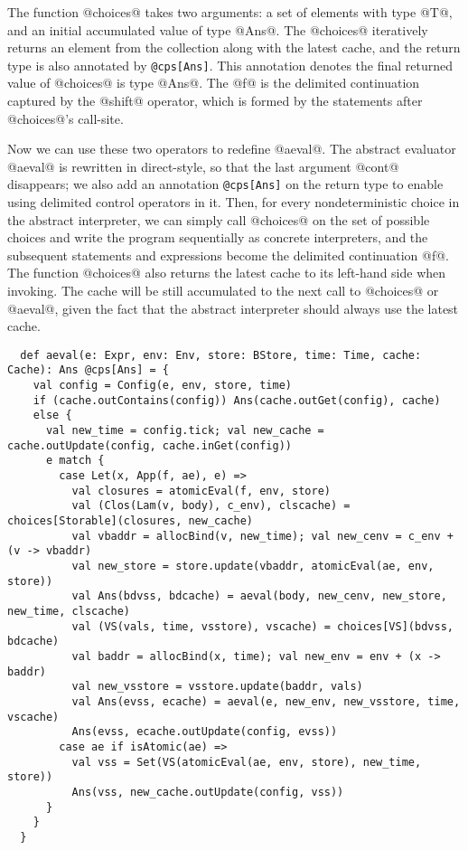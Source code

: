 \documentclass[acmsmall, review]{acmart}\settopmatter{}
\begin{document}
The function @choices@ takes two arguments: a set of elements with type @T@, 
and an initial accumulated value of type @Ans@.
The @choices@ iteratively returns an element from the collection along with the 
latest cache, and the return type is also annotated by \verb|@cps[Ans]|. 
This annotation denotes the final returned value of @choices@ is type @Ans@.
The @f@ is the delimited continuation captured by the @shift@ operator, which
is formed by the statements after @choices@'s call-site.

Now we can use these two operators to redefine @aeval@. The abstract evaluator @aeval@ is
rewritten in direct-style, so that the last argument @cont@ disappears; we also add an 
annotation \verb|@cps[Ans]| on the return type to enable using delimited control operators 
in it.
Then, for every nondeterministic choice in the abstract interpreter, we can simply call 
@choices@ on the set of possible choices and write the program sequentially as concrete 
interpreters, and the subsequent statements and expressions become the delimited continuation
@f@. The function @choices@ also returns the latest cache to its left-hand side when invoking.
The cache will be still accumulated to the next call to @choices@ or @aeval@, 
given the fact that the abstract interpreter should always use the latest cache.

\begin{lstlisting}
  def aeval(e: Expr, env: Env, store: BStore, time: Time, cache: Cache): Ans @cps[Ans] = {
    val config = Config(e, env, store, time)
    if (cache.outContains(config)) Ans(cache.outGet(config), cache)
    else {
      val new_time = config.tick; val new_cache = cache.outUpdate(config, cache.inGet(config))
      e match {
        case Let(x, App(f, ae), e) =>
          val closures = atomicEval(f, env, store)
          val (Clos(Lam(v, body), c_env), clscache) = choices[Storable](closures, new_cache)
          val vbaddr = allocBind(v, new_time); val new_cenv = c_env + (v -> vbaddr)
          val new_store = store.update(vbaddr, atomicEval(ae, env, store))
          val Ans(bdvss, bdcache) = aeval(body, new_cenv, new_store, new_time, clscache)
          val (VS(vals, time, vsstore), vscache) = choices[VS](bdvss, bdcache)
          val baddr = allocBind(x, time); val new_env = env + (x -> baddr)
          val new_vsstore = vsstore.update(baddr, vals)
          val Ans(evss, ecache) = aeval(e, new_env, new_vsstore, time, vscache)
          Ans(evss, ecache.outUpdate(config, evss))
        case ae if isAtomic(ae) =>
          val vss = Set(VS(atomicEval(ae, env, store), new_time, store))
          Ans(vss, new_cache.outUpdate(config, vss))
      }
    }
  }
\end{lstlisting}
\end{document}
